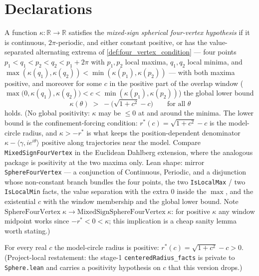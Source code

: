 \section{Declarations}

\begin{definition}
  \label{def:mixed_sign_sphere_four_vertex}
  A function $\kappa:\mathbb R\to\mathbb R$ satisfies the \emph{mixed-sign
  spherical four-vertex hypothesis} if it is continuous, $2\pi$-periodic, and
  either constant positive, or has the value-separated alternating extrema of
  \cref{def:four_vertex_condition} — four points $p_1<q_1<p_2<q_2<p_1+2\pi$
  with $p_1,p_2$ local maxima, $q_1,q_2$ local minima, and
  $\max(\kappa(q_1),\kappa(q_2))<\min(\kappa(p_1),\kappa(p_2))$ — with both
  maxima positive, and moreover for some $c$ in the positive part of the
  overlap window
  ($\max\bigl(0,\kappa(q_1),\kappa(q_2)\bigr)<c<\min(\kappa(p_1),\kappa(p_2))$)
  the global lower bound
  \[
    \kappa(\theta)\;>\;-\bigl(\sqrt{1+c^2}-c\bigr)\qquad\text{for all }\theta
  \]
  holds. (No global positivity: $\kappa$ may be $\le0$ at and around the
  minima. The lower bound is the confinement-forcing condition:
  $r^\ast(c)=\sqrt{1+c^2}-c$ is the model-circle radius, and
  $\kappa>-r^\ast$ is what keeps the position-dependent denominator
  $\kappa-\langle \gamma,ie^{i\theta}\rangle$ positive along trajectories near the
  model. Compare \texttt{MixedSignFourVertex} in the Euclidean Dahlberg
  extension, where the analogous package is positivity at the two maxima
  only. Lean shape: mirror \texttt{SphereFourVertex} — a conjunction of
  Continuous, Periodic, and a disjunction whose non-constant branch bundles
  the four points, the two \texttt{IsLocalMax} / two \texttt{IsLocalMin}
  facts, the value separation with the extra $0$ inside the $\max$, and the
  existential $c$ with the window membership and the global lower bound.
  Note $\mathrm{SphereFourVertex}\;\kappa\to
  \mathrm{MixedSignSphereFourVertex}\;\kappa$: for positive $\kappa$ any
  window midpoint works since $-r^\ast<0<\kappa$; this implication is a cheap
  sanity lemma worth stating.)
\end{definition}

\begin{lemma}
  \label{lem:centered_radius_pos}
  For every real $c$ the model-circle radius is positive:
  $r^\ast(c)=\sqrt{1+c^2}-c>0$. (Project-local restatement: the stage-1
  \texttt{centeredRadius\_facts} is private to \texttt{Sphere.lean} and
  carries a positivity hypothesis on $c$ that this version drops.)
\end{lemma}

